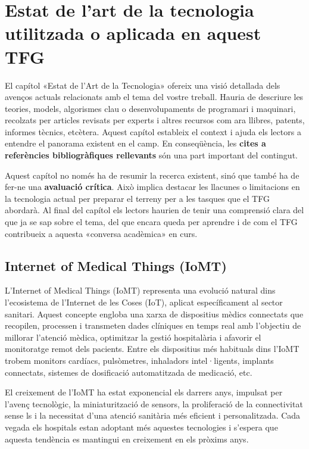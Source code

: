 
\ifcase\doclanguage
\or
  \chapter[Estat de l'art]{Estat de l'art de la tecnologia utilitzada o aplicada en aquest TFG}

  El capítol «Estat de l'Art de la Tecnologia» ofereix una visió detallada dels avenços actuals relacionats amb el tema del vostre treball. Hauria de descriure les teories, models, algorismes clau o desenvolupaments de programari i maquinari, recolzats per articles revisats per experts i altres recursos com ara llibres, patents, informes tècnics, etcètera. Aquest capítol estableix el context i ajuda els lectors a entendre el panorama existent en el camp. En conseqüència, les \textbf{cites a referències bibliogràfiques rellevants} són una part important del contingut.
  
  Aquest capítol no només ha de resumir la recerca existent, sinó que també ha de fer-ne una \textbf{avaluació crítica}. Això implica destacar les llacunes o limitacions en la tecnologia actual per preparar el terreny per a les tasques que el TFG abordarà. Al final del capítol els lectors haurien de tenir una comprensió clara del que ja se sap sobre el tema, del que encara queda per aprendre i de com el TFG contribueix a aquesta «conversa acadèmica» en curs.

  \section{Internet of Medical Things (IoMT)} 
  L’Internet of Medical Things (IoMT) representa una evolució natural dins l’ecosistema de l’Internet de les Coses (IoT), aplicat específicament al sector sanitari. Aquest concepte engloba una xarxa de dispositius mèdics connectats que recopilen, processen i transmeten dades clíniques en temps real amb l’objectiu de millorar l’atenció mèdica, optimitzar la gestió hospitalària i afavorir el monitoratge remot dels pacients. 
  Entre els dispositius més habituals dins l’IoMT trobem monitors cardíacs, pulsòmetres, inhaladors intel·ligents, implants connectats, sistemes de dosificació automatitzada de medicació, etc. 
  
  El creixement de l’IoMT ha estat exponencial els darrers anys, impulsat per l’avenç tecnològic, la miniaturització de sensors, la proliferació de la connectivitat sense ls i la necessitat d’una atenció sanitària més eficient i personalitzada. Cada vegada els hospitals estan adoptant més aquestes tecnologies i s’espera que aquesta tendència es mantingui en creixement en els pròxims anys. 

